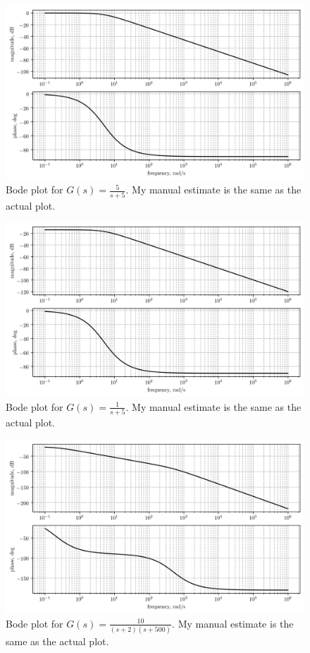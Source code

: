 \documentclass[12pt,a4paper]{article}
\begin{document}
\begin{figure}[!h]
	\centering
	\includegraphics[width=\linewidth]{2.png}
	\caption{Bode plot for $G(s) = \frac{5}{s+5}$. My manual estimate is the same as the actual plot.}
\end{figure}

\begin{figure}[!h]
	\centering
	\includegraphics[width=\linewidth]{3.png}
	\caption{Bode plot for $G(s) = \frac{1}{s+5}$. My manual estimate is the same as the actual plot.}
\end{figure}

\begin{figure}[!h]
	\centering
	\includegraphics[width=\linewidth]{4.png}
	\caption{Bode plot for $G(s) = \frac{10}{(s+2)(s+500)}$. My manual estimate is the same as the actual plot.}
\end{figure}
\end{document}
